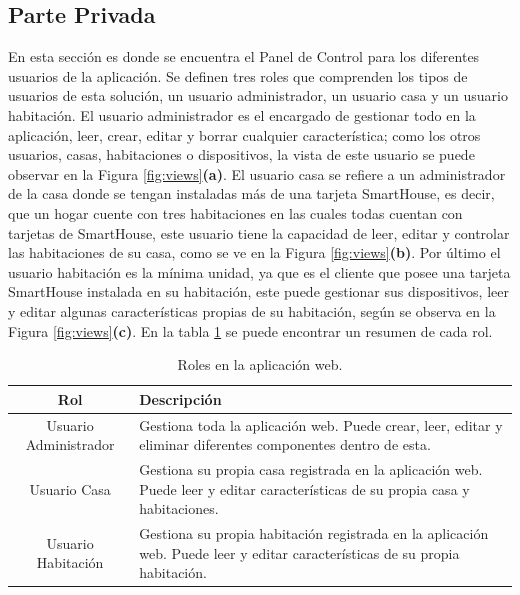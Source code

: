 \subsection{Parte Privada}

En esta sección es donde se encuentra el Panel de Control para los diferentes usuarios de la aplicación. Se definen tres roles que comprenden los tipos de usuarios de esta solución, un usuario administrador, un usuario casa y un usuario habitación. El usuario administrador es el encargado de gestionar todo en la aplicación, leer, crear, editar y borrar cualquier característica; como los otros usuarios, casas, habitaciones o dispositivos, la vista de este usuario se puede observar en la Figura \ref{fig:views}\textbf{(a)}. El usuario casa se refiere a un administrador de la casa donde se tengan instaladas más de una tarjeta SmartHouse, es decir, que un hogar cuente con tres habitaciones en las cuales todas cuentan con tarjetas de SmartHouse, este usuario tiene la capacidad de leer, editar y controlar las habitaciones de su casa, como se ve en la Figura \ref{fig:views}\textbf{(b)}. Por último el usuario habitación es la mínima unidad, ya que es el cliente que posee una tarjeta SmartHouse instalada en su habitación, este puede gestionar sus dispositivos, leer y editar algunas características propias de su habitación, según se observa en la Figura \ref{fig:views}\textbf{(c)}. En la tabla \ref{table:roles} se puede encontrar un resumen de cada rol.\\

\begin{table}[H]
	\begin{center}
		\caption{Roles en la aplicación web.}
		\label{table:roles}
		\begin{tabular}{|c|p{8cm}|}
			\hline 
			\textbf{Rol} & \textbf{Descripción} \\ 
			\hline 
			Usuario Administrador & Gestiona toda la aplicación web. Puede crear, leer, editar y eliminar diferentes componentes dentro de esta.\\ 
			\hline 
			Usuario Casa & Gestiona su propia casa registrada en la aplicación web. Puede leer y editar características de su propia casa y habitaciones.\\ 
			\hline 
			Usuario Habitación & Gestiona su propia habitación registrada en la aplicación web. Puede leer y editar características de su propia habitación.\\ 
			\hline 
		\end{tabular} 
	\end{center}
\end{table}

